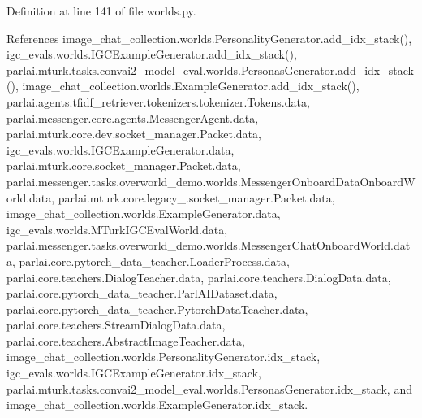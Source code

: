 Definition at line 141 of file worlds.\+py.



References image\+\_\+chat\+\_\+collection.\+worlds.\+Personality\+Generator.\+add\+\_\+idx\+\_\+stack(), igc\+\_\+evals.\+worlds.\+I\+G\+C\+Example\+Generator.\+add\+\_\+idx\+\_\+stack(), parlai.\+mturk.\+tasks.\+convai2\+\_\+model\+\_\+eval.\+worlds.\+Personas\+Generator.\+add\+\_\+idx\+\_\+stack(), image\+\_\+chat\+\_\+collection.\+worlds.\+Example\+Generator.\+add\+\_\+idx\+\_\+stack(), parlai.\+agents.\+tfidf\+\_\+retriever.\+tokenizers.\+tokenizer.\+Tokens.\+data, parlai.\+messenger.\+core.\+agents.\+Messenger\+Agent.\+data, parlai.\+mturk.\+core.\+dev.\+socket\+\_\+manager.\+Packet.\+data, igc\+\_\+evals.\+worlds.\+I\+G\+C\+Example\+Generator.\+data, parlai.\+mturk.\+core.\+socket\+\_\+manager.\+Packet.\+data, parlai.\+messenger.\+tasks.\+overworld\+\_\+demo.\+worlds.\+Messenger\+Onboard\+Data\+Onboard\+World.\+data, parlai.\+mturk.\+core.\+legacy\+\_.\+socket\+\_\+manager.\+Packet.\+data, image\+\_\+chat\+\_\+collection.\+worlds.\+Example\+Generator.\+data, igc\+\_\+evals.\+worlds.\+M\+Turk\+I\+G\+C\+Eval\+World.\+data, parlai.\+messenger.\+tasks.\+overworld\+\_\+demo.\+worlds.\+Messenger\+Chat\+Onboard\+World.\+data, parlai.\+core.\+pytorch\+\_\+data\+\_\+teacher.\+Loader\+Process.\+data, parlai.\+core.\+teachers.\+Dialog\+Teacher.\+data, parlai.\+core.\+teachers.\+Dialog\+Data.\+data, parlai.\+core.\+pytorch\+\_\+data\+\_\+teacher.\+Parl\+A\+I\+Dataset.\+data, parlai.\+core.\+pytorch\+\_\+data\+\_\+teacher.\+Pytorch\+Data\+Teacher.\+data, parlai.\+core.\+teachers.\+Stream\+Dialog\+Data.\+data, parlai.\+core.\+teachers.\+Abstract\+Image\+Teacher.\+data, image\+\_\+chat\+\_\+collection.\+worlds.\+Personality\+Generator.\+idx\+\_\+stack, igc\+\_\+evals.\+worlds.\+I\+G\+C\+Example\+Generator.\+idx\+\_\+stack, parlai.\+mturk.\+tasks.\+convai2\+\_\+model\+\_\+eval.\+worlds.\+Personas\+Generator.\+idx\+\_\+stack, and image\+\_\+chat\+\_\+collection.\+worlds.\+Example\+Generator.\+idx\+\_\+stack.

